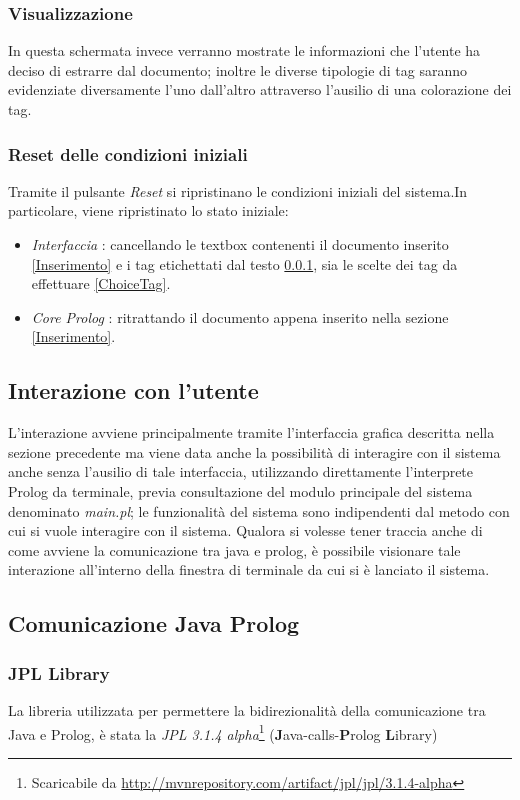     \subsubsection{Visualizzazione}
    \label{Visualization}
    In questa schermata invece verranno mostrate le informazioni che l'utente ha deciso di estrarre dal documento; inoltre le diverse tipologie di tag saranno evidenziate diversamente l'uno dall'altro attraverso l'ausilio di una colorazione dei tag. 

    \subsubsection{Reset delle condizioni iniziali}
    Tramite il pulsante \emph{Reset} si ripristinano le condizioni iniziali del sistema.In particolare, viene ripristinato lo stato iniziale:
    \begin{itemize}
      \item \emph{Interfaccia} : cancellando le textbox contenenti il documento inserito \ref{Inserimento} e i tag etichettati dal testo \ref{Visualization}, sia le scelte dei tag da effettuare \ref{ChoiceTag}.
      \item \emph{Core Prolog} : ritrattando il documento appena inserito nella sezione \ref{Inserimento}.
    \end{itemize}
    
\subsection{Interazione con l’utente} %
L’interazione avviene principalmente tramite l'interfaccia grafica descritta nella sezione precedente ma viene data anche la possibilità di interagire con il sistema anche senza l'ausilio di tale interfaccia, utilizzando direttamente l'interprete Prolog da terminale, previa consultazione del modulo principale del sistema denominato \emph{main.pl}; le funzionalità del sistema sono indipendenti dal metodo con cui si vuole interagire con il  sistema. Qualora si volesse tener traccia anche di come avviene la comunicazione tra java e prolog, è possibile visionare tale interazione all'interno della finestra di terminale da cui si è lanciato il sistema.

\subsection{Comunicazione Java Prolog}
\subsubsection{JPL Library}
\nocite{swi:jpl}
La libreria utilizzata per permettere la bidirezionalità della comunicazione tra Java e Prolog, è stata la \emph{JPL 3.1.4 alpha}\footnote{Scaricabile da \url{http://mvnrepository.com/artifact/jpl/jpl/3.1.4-alpha}} (\textbf{J}ava-calls-\textbf{P}rolog \textbf{L}ibrary)


